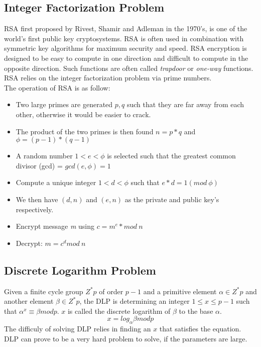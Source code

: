 \documentclass[journal]{IEEEtran}
\begin{document}
\subsection{Integer Factorization Problem}
RSA first proposed by Rivest, Shamir and Adleman in the 1970's, is one of the world's first public key cryptosystems. RSA is often used in combination with symmetric key algorithms for 
maximum security and speed. RSA encryption is designed to be easy to compute in one direction and difficult to compute in the opposite direction. Such functions are often called \emph{trapdoor}
or \emph{one-way} functions. RSA relies on the integer factorization problem via prime numbers. \\ 
The operation of RSA is as follow:
\begin{itemize}
  \item Two large primes are generated $p, q$ such that they are far away from each other, otherwise it would be easier to crack.
  \item The product of the two primes is then found $n=p*q$ and $\phi = (p-1)*(q-1)$
  \item A random number $1<e<\phi$ is selected such that the greatest common divisor (gcd) = $gcd(e, \phi) = 1$
  \item Compute a unique integer $1<d<\phi$ such that $e*d = 1(mod~\phi)$
  \item We then have $(d, n)$ and $(e, n)$ as the private and public key's respectively.
  \item Encrypt message \emph{m} using $c=m^e*mod~n$
  \item Decrypt: $m=c^d mod~n$
\end{itemize}

\subsection{Discrete Logarithm Problem}
Given a finite cycle group $Z^*p$ of order $p-1$ and a primitive element $\alpha \in Z^*p$ and another element $\beta \in Z^*p$, the DLP is determining an integer $1 \leq x \leq p-1$
such that $\alpha^x \equiv \beta mod p$. $x$ is called the discrete logarithm of $\beta$ to the base $\alpha$. 
$$x = log_\alpha \beta mod p$$ The difficuly of solving DLP relies in finding an $x$ that satisfies the equation. DLP can prove to be a very hard problem to solve, if the parameters are large.
\end{document}
